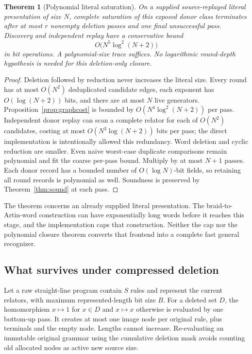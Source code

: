 \documentclass[11pt]{article}
\newtheorem{theorem}{Theorem}[section]
\theoremstyle{definition}\newtheorem{definition}[theorem]{Definition}
\theoremstyle{remark}\newtheorem{remark}[theorem]{Remark}
\begin{document}
\begin{theorem}[Polynomial literal saturation]\label{thm:closure}
On a supplied source-replayed literal presentation of size $N$, complete
saturation of this exposed donor class terminates after at most $r$
nonempty deletion passes and one final unsuccessful pass. Discovery and
independent replay have a conservative bound
\begin{equation}\label{eq:closurecost}
 O\bigl(N^5\log^2(N+2)\bigr)
\end{equation}
in bit operations. A polynomial-size trace suffices. No logarithmic
round-depth hypothesis is needed for this deletion-only closure.
\end{theorem}
\begin{proof}
Deletion followed by reduction never increases the literal size. Every
round has at most $O(N^2)$ deduplicated candidate edges, each exponent has
$O(\log(N+2))$ bits, and there are at most $N$ live generators.
Proposition~\ref{prop:graphcost} is bounded by
$O(N^4\log^2(N+2))$ per pass. Independent donor replay can scan a complete
relator for each of $O(N^2)$ candidates, costing at most
$O(N^3\log(N+2))$ bits per pass; the direct implementation is intentionally
allowed this redundancy. Word deletion and cyclic reduction are smaller.
Even naive worst-case duplicate comparisons remain polynomial and fit the
coarse per-pass bound. Multiply by at most $N+1$ passes. Each donor record
has a bounded number of $O(\log N)$-bit fields, so retaining all round
records is polynomial as well. Soundness is preserved by
Theorem~\ref{thm:sound} at each pass.
\end{proof}

The theorem concerns an already supplied literal presentation. The
braid-to-Artin-word construction can have exponentially long words before
it reaches this stage, and the implementation caps that construction.
Neither the cap nor the polynomial closure theorem converts that frontend
into a complete fast general recognizer.

\subsection{What survives under compressed deletion}
Let a raw straight-line program contain $S$ rules and represent the current
relators, with maximum represented-length bit size $B$. For a deleted
set $D$, the homomorphism $x\mapsto1$ for $x\in D$ and $x\mapsto x$
otherwise is evaluated by one bottom-up pass. It creates at most one
image node per original rule, plus terminals and the empty node. Lengths
cannot increase. Re-evaluating an immutable original grammar using the
cumulative deletion mask avoids counting old allocated nodes as active
new source size.
\end{document}
